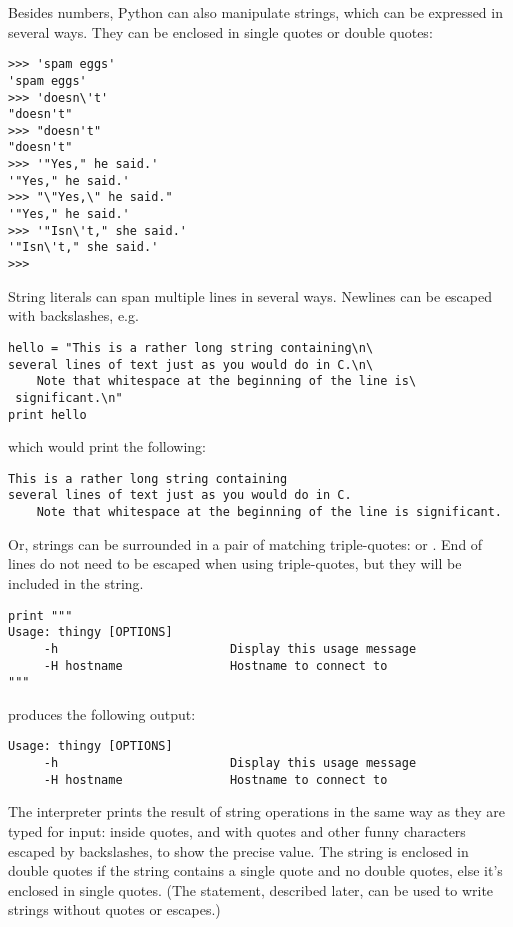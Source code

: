Besides numbers, Python can also manipulate strings, which can be
expressed in several ways.  They can be enclosed in single quotes or
double quotes:

\bcode\begin{verbatim}
>>> 'spam eggs'
'spam eggs'
>>> 'doesn\'t'
"doesn't"
>>> "doesn't"
"doesn't"
>>> '"Yes," he said.'
'"Yes," he said.'
>>> "\"Yes,\" he said."
'"Yes," he said.'
>>> '"Isn\'t," she said.'
'"Isn\'t," she said.'
>>> 
\end{verbatim}\ecode
%
String literals can span multiple lines in several ways.  Newlines can be escaped with backslashes, e.g.

\begin{verbatim}
hello = "This is a rather long string containing\n\
several lines of text just as you would do in C.\n\
    Note that whitespace at the beginning of the line is\
 significant.\n"
print hello
\end{verbatim}

which would print the following:
\begin{verbatim}
This is a rather long string containing
several lines of text just as you would do in C.
    Note that whitespace at the beginning of the line is significant.
\end{verbatim}

Or, strings can be surrounded in a pair of matching triple-quotes:
\code{"""} or .  End of lines do not need to be escaped
when using triple-quotes, but they will be included in the string.

\begin{verbatim}
print """
Usage: thingy [OPTIONS] 
     -h                        Display this usage message
     -H hostname               Hostname to connect to
"""
\end{verbatim}

produces the following output:

\bcode\begin{verbatim}
Usage: thingy [OPTIONS] 
     -h                        Display this usage message
     -H hostname               Hostname to connect to
\end{verbatim}\ecode
%
The interpreter prints the result of string operations in the same way
as they are typed for input: inside quotes, and with quotes and other
funny characters escaped by backslashes, to show the precise
value.  The string is enclosed in double quotes if the string contains
a single quote and no double quotes, else it's enclosed in single
quotes.  (The \code{print} statement, described later, can be used to
write strings without quotes or escapes.)

